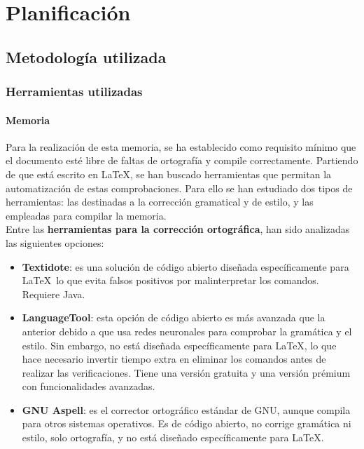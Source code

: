 \chapter{Planificación}

\section{Metodología utilizada}

\subsection{Herramientas utilizadas}

\subsubsection{Memoria}
Para la realización de esta memoria, se ha establecido como requisito mínimo que
el documento esté libre de faltas de ortografía y compile correctamente. Partiendo de que 
está escrito en \LaTeX, se han buscado herramientas que permitan la automatización de estas 
comprobaciones. Para ello se han estudiado dos tipos de herramientas: las destinadas a la
corrección gramatical y de estilo, y las empleadas para compilar la memoria.
\\

Entre las \textbf{herramientas para la corrección ortográfica}, han sido analizadas las siguientes
opciones:

\begin{itemize}
    \item \textbf{Textidote}: es una solución de código abierto diseñada específicamente para
    \LaTeX\, lo que evita falsos positivos por malinterpretar los comandos. Requiere Java.
    \item \textbf{LanguageTool}: esta opción de código abierto es más avanzada que la anterior 
    debido a que usa redes neuronales para comprobar la gramática y el estilo. 
    Sin embargo, no está diseñada específicamente para \LaTeX, lo que hace necesario 
    invertir tiempo extra en eliminar los comandos antes de realizar las verificaciones.
    Tiene una versión gratuita y una versión prémium con funcionalidades avanzadas.
    \item \textbf{GNU Aspell}: es el corrector ortográfico estándar de GNU, aunque compila para
    otros sistemas operativos. Es de código abierto, no corrige gramática ni estilo, solo
    ortografía, y no está diseñado específicamente para \LaTeX.
\end{itemize}

